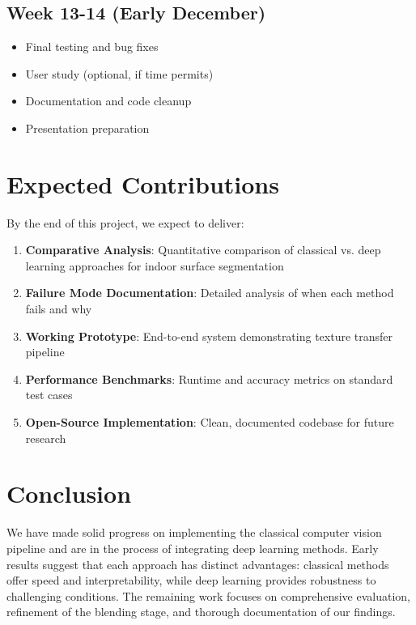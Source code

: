 \documentclass[11pt]{article}
\begin{document}
\subsection{Week 13-14 (Early December)}
\begin{itemize}
    \item Final testing and bug fixes
    \item User study (optional, if time permits)
    \item Documentation and code cleanup
    \item Presentation preparation
\end{itemize}

\section{Expected Contributions}

By the end of this project, we expect to deliver:

\begin{enumerate}
    \item \textbf{Comparative Analysis}: Quantitative comparison of classical vs. deep learning approaches for indoor surface segmentation
    \item \textbf{Failure Mode Documentation}: Detailed analysis of when each method fails and why
    \item \textbf{Working Prototype}: End-to-end system demonstrating texture transfer pipeline
    \item \textbf{Performance Benchmarks}: Runtime and accuracy metrics on standard test cases
    \item \textbf{Open-Source Implementation}: Clean, documented codebase for future research
\end{enumerate}

\section{Conclusion}

We have made solid progress on implementing the classical computer vision pipeline and are in the process of integrating deep learning methods. Early results suggest that each approach has distinct advantages: classical methods offer speed and interpretability, while deep learning provides robustness to challenging conditions. The remaining work focuses on comprehensive evaluation, refinement of the blending stage, and thorough documentation of our findings.
\end{document}
